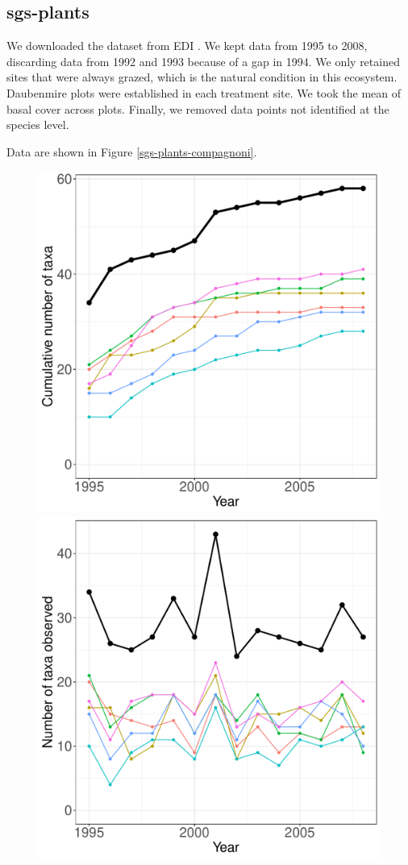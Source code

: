 \documentclass[11pt, oneside]{article}
\begin{document}
\subsection{sgs-plants}
We downloaded the dataset from EDI \citep{milchunas_sgs-lter_2014}. 
We kept data from 1995 to 2008, discarding data from 1992 and 1993 because of a gap in 1994. 
We only retained sites that were always grazed, which is the natural condition in this ecosystem. 
Daubenmire plots were established in each treatment site.
We took the mean of basal cover across plots. Finally, we removed data points not identified at the species level.

Data are shown in Figure \ref{sgs-plants-compagnoni}.
\begin{figure}[h!]
\centering
\includegraphics[scale = 0.4]{sgs-plants-compagnoni_species_accumulation_curve.pdf}
\includegraphics[scale = 0.4]{sgs-plants-compagnoni_num_taxa_over_time.pdf}

\end{figure}
\end{document}
